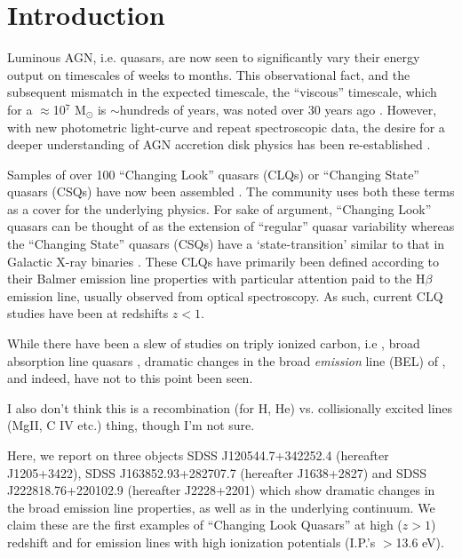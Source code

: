 \documentclass[a4paper,fleqn,usenatbib]{mnras}
\begin{document}
\section{Introduction}
Luminous AGN, i.e. quasars, are now seen to significantly vary their energy output on timescales of weeks to months. 
This observational fact, and the subsequent mismatch in the expected timescale, the ``viscous'' timescale, 
which for a $\approx$10$^{7}$ M$_{\odot}$ is $\sim$hundreds of years, was noted over 30 years ago \citep[e.g.][]{Alloin1985}. 
However, with new photometric light-curve and repeat spectroscopic data, the desire for a deeper understanding 
of AGN accretion disk physics  has been re-established \citep[e.g.][]{Lawrence2018, Antonucci2018}. 

Samples of over 100 ``Changing Look'' quasars (CLQs) or ``Changing State'' quasars (CSQs) have now been 
assembled \citep[e.g.][]{MacLeod2019, Graham2019}. The community uses both these
terms as a cover for the underlying physics. For sake of argument, ``Changing Look'' quasars can be 
thought of as the extension of ``regular'' quasar variability \citep[e.g.][]{MacLeod2012} whereas 
the ``Changing State'' quasars (CSQs) have a `state-transition' similar to that in Galactic X-ray binaries
\citep[e.g][]{NodaDone2018, Ruan2019}. 
%
These CLQs have primarily been defined according to their Balmer emission line properties with 
particular attention paid to the H$\beta$ emission line, usually observed from optical spectroscopy. 
As such, current CLQ studies have been at redshifts $z<1$. 


While there have been a slew of studies on triply ionized carbon, i.e \civ, broad absorption line quasars
\citep[BAL QSOs; see e.g. Table 1][]{Hemler2019}, dramatic changes in the 
broad {\it emission} line (BEL) of \civ, and indeed, \ciii have not to this point been seen. 

I also don’t think this is a recombination (for H, He) vs. collisionally excited lines (MgII, C IV etc.) thing, though I’m not sure. 


Here, we report on three objects 
SDSS J120544.7+342252.4  (hereafter J1205+3422), 
SDSS J163852.93+282707.7 (hereafter J1638+2827) and
SDSS J222818.76+220102.9 (hereafter J2228+2201)  
which show dramatic changes in the \civ broad emission line
properties, as well as in the underlying continuum. We claim these are
the first examples of ``Changing Look Quasars'' at high ($z>1$)
redshift and for emission lines with high ionization potentials
(I.P.'s $>$13.6 eV).
\end{document}
